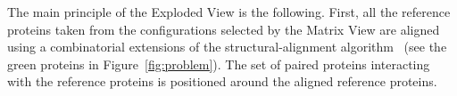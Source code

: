 \documentclass[twocolumn]{bmcart}%
\def\ExpView {Exploded View\xspace}
\def\MatView {Matrix View\xspace}
\begin{document}

The main principle of the \ExpView is the following.
First, all the reference proteins taken from the configurations selected by the \MatView are aligned using a combinatorial extensions of the structural-alignment algorithm~\cite{Shindyalov1998} (see the green proteins in Figure~\ref{fig:problem}).
The set of paired proteins interacting with the reference proteins is positioned around the aligned reference proteins.
\end{document}
